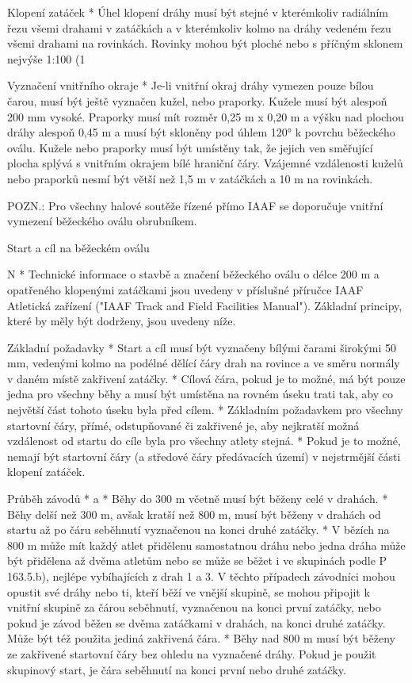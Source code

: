 Klopení zatáček
* Úhel klopení dráhy musí být stejné v kterémkoliv radiálním řezu všemi drahami v zatáčkách a v kterémkoliv kolmo na dráhy vedeném řezu všemi drahami na rovinkách. Rovinky mohou být ploché nebo s příčným sklonem nejvýše 1:100 (1 %

Vyznačení vnitřního okraje
* Je-li vnitřní okraj dráhy vymezen pouze bílou čarou, musí být ještě vyznačen kužel, nebo praporky. Kužele musí být alespoň 200 mm vysoké. Praporky musí mít rozměr 0,25 m x 0,20 m a výšku nad plochou dráhy alespoň 0,45 m a musí být skloněny pod úhlem 120° k povrchu běžeckého oválu. Kužele nebo praporky musí být umístěny tak, že jejich ven směřující plocha splývá s vnitřním okrajem bílé hraniční čáry. Vzájemné vzdálenosti kuželů nebo praporků nesmí být větší než 1,5 m v zatáčkách a 10 m na rovinkách.

POZN.: Pro všechny halové soutěže řízené přímo IAAF se doporučuje vnitřní vymezení běžeckého oválu obrubníkem.
\enditems

\secc Start a cíl na běžeckém oválu

\begitems \style N
* Technické informace o stavbě a značení běžeckého oválu o délce 200 m a opatřeného klopenými zatáčkami jsou uvedeny v příslušné příručce IAAF Atletická zařízení ("IAAF Track and Field Facilities Manual"). Základní principy, které by měly být dodrženy, jsou uvedeny níže.

Základní požadavky
* Start a cíl musí být vyznačeny bílými čarami širokými 50 mm, vedenými kolmo na podélné dělící čáry drah na rovince a ve směru normály v daném místě zakřivení zatáčky.
* Cílová čára, pokud je to možné, má být pouze jedna pro všechny běhy a musí být umístěna na rovném úseku trati tak, aby co největší část tohoto úseku byla před cílem.
* Základním požadavkem pro všechny startovní čáry, přímé, odstupňované či zakřivené je, aby nejkratší možná vzdálenost od startu do cíle byla pro všechny atlety stejná.
* Pokud je to možné, nemají být startovní čáry (a středové čáry předávacích území) v nejstrmější části klopení zatáček.

Průběh závodů
* \begitems \style a
  * Běhy do 300 m včetně musí být běženy celé v drahách.
  * Běhy delší než 300 m, avšak kratší než 800 m, musí být běženy v drahách od startu až po čáru seběhnutí vyznačenou na konci druhé zatáčky.
  * V bězích na 800 m může mít každý atlet přidělenu samostatnou dráhu nebo jedna dráha může být přidělena až dvěma atletům nebo se může se běžet i ve skupinách podle P 163.5.b), nejlépe vybíhajících z drah 1 a 3. V těchto případech závodníci mohou opustit své dráhy nebo ti, kteří běží ve vnější skupině, se mohou připojit k vnitřní skupině za čárou seběhnutí, vyznačenou na konci první zatáčky, nebo pokud je závod běžen se dvěma zatáčkami v drahách, na konci druhé zatáčky. Může být též použita jediná zakřivená čára.
  * Běhy nad 800 m musí být běženy ze zakřivené startovní čáry bez ohledu na vyznačené dráhy. Pokud je použit skupinový start, je čára seběhnutí na konci první nebo druhé zatáčky.
  \enditems

